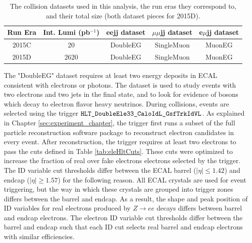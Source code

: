 \begin{table}[h]
\caption{The collision datasets used in this analysis, the run eras they correspond to, and their total size (both dataset pieces for 2015D).}
\label{tab:collisionDatasets}
\centering
\begin{tabular}{c|c|c|c|c}
Run Era & Int. Lumi (pb$^{-1}$) & eejj dataset & $\mu\mu$jj dataset & e$\mu$jj dataset \\  \hline
	2015C &  20  &  DoubleEG  &  SingleMuon  &  MuonEG  \\
	2015D &  2620  &  DoubleEG  &  SingleMuon  &  MuonEG  \\ \hline
\end{tabular}
\end{table}

The "DoubleEG" dataset requires at least two energy deposits in ECAL 
consistent with electrons or photons.  The dataset is used to study events with two electrons and two jets
in the final state, and to look for evidence of \WR bosons which decay to electron flavor
heavy neutrinos.  During collisions, events are selected using the trigger $\verb|HLT_DoubleEle33_CaloIdL_GsfTrkIdVL|$.
As explained in Chapter \ref{sec:experiment_chapter}, the trigger first runs a subset of the full
particle reconstruction software package to reconstruct electron candidates in
every event.  After reconstruction, the trigger requires at least two electrons to pass
the cuts defined in Table \ref{tab:eleHltCuts}.  These cuts were optimized to increase the fraction
of real over fake electrons electrons selected by the trigger.
The ID variable cut thresholds differ between the ECAL barrel ($|\eta| \leq 1.42$)
and endcap ($|\eta| \geq 1.57$) for the following reason.  All ECAL crystals are used for event
triggering, but the way in which these crystals are grouped into trigger zones differs between the
barrel and endcap.  As a result, the shape and peak position of ID variables for real electrons
produced by $Z \rightarrow ee$ decays differs between barrel and endcap electrons.  The electron
ID variable cut thresholds differ between the barrel and endcap such that each ID cut selects
real barrel and endcap electrons with similar efficiencies.



